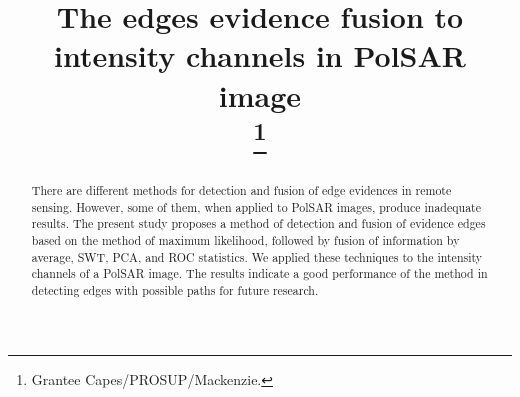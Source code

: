 \documentclass[conference]{IEEEtran}
\begin{document}
\title{The edges evidence fusion to intensity channels in
PolSAR image\\
\thanks{Grantee Capes/PROSUP/Mackenzie.}
}

\author{
\and
{}
\and
{}
}

\maketitle

\begin{abstract}
There are different methods for detection and fusion of edge evidences in remote sensing. 
However, some of them, when applied to PolSAR images, produce inadequate results. 
The present study proposes a method of detection and fusion of evidence edges based on the method of maximum likelihood, followed by fusion of information by average, SWT, PCA, and ROC statistics. 
We applied these techniques to the intensity channels of a PolSAR image. 
The results indicate a good performance of the method in detecting edges with possible paths for future research.
\end{abstract}
\end{document}
